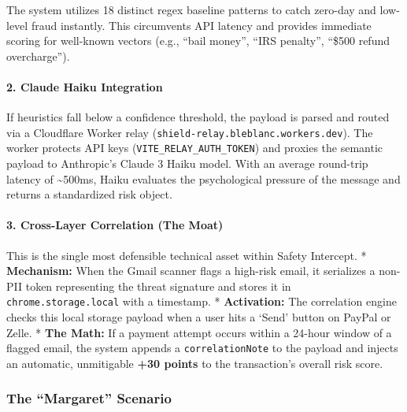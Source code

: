 \documentclass[
]{article}
\begin{document}
The system utilizes 18 distinct regex baseline patterns to catch
zero-day and low-level fraud instantly. This circumvents API latency and
provides immediate scoring for well-known vectors (e.g., ``bail money'',
``IRS penalty'', ``\$500 refund overcharge'').

\paragraph{2. Claude Haiku Integration}\label{claude-haiku-integration}

If heuristics fall below a confidence threshold, the payload is parsed
and routed via a Cloudflare Worker relay
(\texttt{shield-relay.bleblanc.workers.dev}). The worker protects API
keys (\texttt{VITE\_RELAY\_AUTH\_TOKEN}) and proxies the semantic
payload to Anthropic's Claude 3 Haiku model. With an average round-trip
latency of \textasciitilde500ms, Haiku evaluates the psychological
pressure of the message and returns a standardized risk object.

\paragraph{3. Cross-Layer Correlation (The
Moat)}\label{cross-layer-correlation-the-moat}

This is the single most defensible technical asset within Safety
Intercept. * \textbf{Mechanism:} When the Gmail scanner flags a
high-risk email, it serializes a non-PII token representing the threat
signature and stores it in \texttt{chrome.storage.local} with a
timestamp. * \textbf{Activation:} The correlation engine checks this
local storage payload when a user hits a `Send' button on PayPal or
Zelle. * \textbf{The Math:} If a payment attempt occurs within a 24-hour
window of a flagged email, the system appends a \texttt{correlationNote}
to the payload and injects an automatic, unmitigable \textbf{+30 points}
to the transaction's overall risk score.

\subsubsection{The ``Margaret'' Scenario}\label{the-margaret-scenario}
\end{document}
